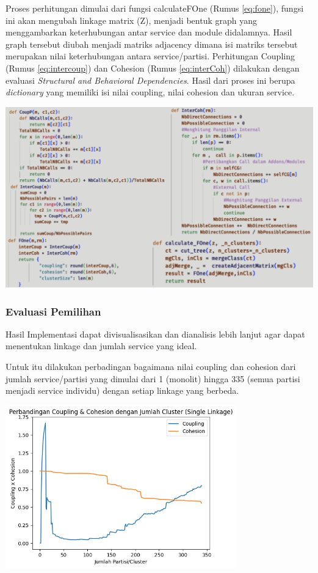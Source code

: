 Proses perhitungan dimulai dari fungsi calculateFOne (Rumus \ref{eq:fone}), fungsi ini akan mengubah linkage matrix (Z), menjadi bentuk graph yang menggambarkan keterhubungan antar service dan module didalamnya. Hasil graph tersebut diubah menjadi matriks adjacency dimana isi matriks tersebut merupakan nilai keterhubungan antara service/partisi. Perhitungan Coupling (Rumus \ref{eq:intercoup}) dan Cohesion (Rumus \ref{eq:interCoh}) dilakukan dengan evaluasi \textit{Structural and Behavioral Dependencies}. 
Hasil dari proses ini berupa \textit{dictionary} yang memiliki isi nilai coupling, nilai cohesion dan ukuran service.

\begin{center}
	\includegraphics[width=14cm]{img/bab_4/coding_evaluasi.png}
	\label{fig:coding_evaluasi}
\end{center}


\subsubsection{Evaluasi Pemilihan}
Hasil Implementasi dapat divisualisasikan dan dianalisis lebih lanjut agar dapat menentukan linkage dan jumlah service yang ideal. 

Untuk itu dilakukan perbadingan bagaimana nilai coupling dan cohesion dari jumlah service/partisi yang dimulai dari 1 (monolit) hingga 335 (semua partisi menjadi service individu) dengan setiap linkage yang berbeda.

\begin{center}
	\includegraphics[width=10cm]{img/bab_4/cc_single.png}
	\label{fig:cc_single}
\end{center}

